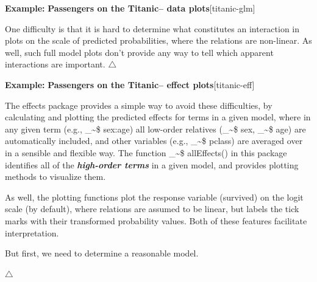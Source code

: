 \documentclass{article}
\makeatletter
\newcommand\code{\bgroup\@makeother\_\@makeother\~\@makeother\$\@codex}
\def\@codex#1{{\normalfont\ttfamily\hyphenchar\font=-1 #1}\egroup}
\newcommand{\func}[1]{\code{#1()}}
\newcommand{\pkg}[1]{\textsf{#1}}
\newcommand{\Rpackage}[1]{\pkg{#1} package}
\newcommand{\glossterm}[1]{\textit{\textbf{#1}}}
\newenvironment{Example}[2][unnamed-example]%
  {\medskip\noindent\textbf{\textsf{Example:}}
   \textbf{#2}\hfill [#1]\par\smallskip
  }
  {\hfill $\triangle$}
\makeatother
\begin{document}
\begin{Example}[titanic-glm]{Passengers on the Titanic-- data plots}
One difficulty is that it is hard to determine what constitutes an interaction
 in plots on
the scale of predicted probabilities, where the relations are non-linear. 
As well, such full model plots don't provide any way to tell which apparent
interactions are important.
\end{Example}

\begin{Example}[titanic-eff]{Passengers on the Titanic-- effect plots}

The \Rpackage{effects} provides a simple way to avoid these difficulties,
by calculating and plotting the predicted effects for terms in a given
model, where in any given term (e.g., \code{sex:age}) all low-order relatives
(\code{sex}, \code{age}) are automatically included, and other variables
(e.g., \code{pclass}) are averaged over in a sensible and flexible way.
The function \func{allEffects} in this package identifies all of the
\glossterm{high-order terms} in a given model, and provides plotting methods to visualize
them.  

As well, the plotting functions plot the response variable
(survived) on the logit scale (by default), where relations are assumed to be linear,
but labels the tick marks with their transformed probability values.
Both of these features facilitate interpretation.

But first, we need to determine a reasonable model.


\end{Example}
\end{document}

